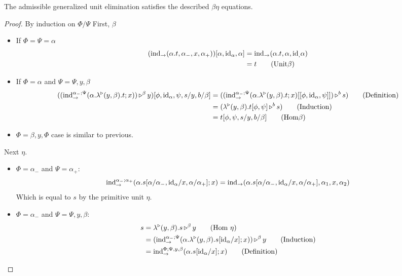 \documentclass{llncs}
\begin{document}
\begin{lemma}
  The admissible generalized unit elimination satisfies the described $\beta\eta$ equations.
\end{lemma}
\begin{proof}
  By induction on $\Phi/\Psi$
  First, $\beta$
  \begin{itemize}
  \item If $\Phi = \Psi = \alpha$
    \begin{align*}
    (\punitelimkontZatABC{\alpha.t}{\alpha_-}{x}{\alpha_+})[\alpha,\punitrefl \alpha, \alpha] &=
    \punitelimkontZatABC{\alpha.t}{\alpha}{\punitrefl}{\alpha}\\
    &= t \tag{Unit$\beta$}
  \end{align*}
  \item If $\Phi = \alpha$ and $\Psi = \Psi, y, \beta$
    \begin{align*}
    (\homrappXtoYatZ
      {(\textrm{ind}_{\to}^{\alpha_-;\Psi}(\alpha.\homrlambdaXatYdotZ y \beta t; x))} y \beta)[\phi,\punitrefl \alpha, \psi, s/y, b/\beta]
      &= (\homrappXtoYatZ
        {(\textrm{ind}_{\to}^{\alpha_-;\Psi}(\alpha.\homrlambdaXatYdotZ y \beta t; x)[[\phi,\punitrefl \alpha, \psi]])} s b)\tag{Definition}\\
      &= (\homrappXtoYatZ {\homrlambdaXatYdotZ y \beta t[\phi,\psi]} s b) \tag{Induction}\\
      &= t[\phi,\psi,s/y,b/\beta]\tag{Hom$\beta$}
    \end{align*}
  \item $\Phi = \beta, y, \Phi$ case is similar to previous.
  \end{itemize}
  
  Next $\eta$.
  \begin{itemize}
  \item $\Phi = \alpha_- $ and $\Psi = \alpha_+$:
    \[ \textrm{ind}_{\to}^{\alpha_-;\alpha_+}(\alpha. s[\alpha/\alpha_-,\punitrefl \alpha/x,\alpha/\alpha_+]; x)
    = \punitelimkontZatABC {\alpha. s[\alpha/\alpha_-,\punitrefl \alpha/x,\alpha/\alpha_+]} {\alpha_1}{x}{\alpha_2}
    \]
    Which is equal to $s$ by the primitive unit $\eta$.
  \item $\Phi = \alpha_-$ and $\Psi = \Psi, y, \beta$:
    \begin{align*}
      s &= \homrappXtoYatZ {\homrlambdaXatYdotZ y \beta s} y \beta\tag{Hom $\eta$}\\
      &= \homrappXtoYatZ {(\textrm{ind}_{\to}^{\alpha_-;\Psi}(\alpha.\homrlambdaXatYdotZ y \beta {s[\punitrefl \alpha/x]}; x))} y \beta \tag{Induction}\\
      &= \textrm{ind}_{\to}^{\Phi;\Psi,y,\beta}(\alpha. s[\punitrefl \alpha/x]; x)\tag{Definition}
    \end{align*}
  \end{itemize}
\end{proof}
\end{document}
